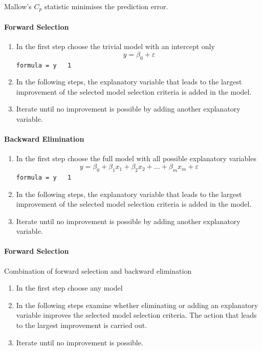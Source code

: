 \documentclass[11pt]{article}
\theoremstyle{definition}
\begin{document}
Mallow’s $C_p$ statistic minimises the prediction error.

\paragraph{Forward Selection}
\begin{enumerate}
	\item In the first step choose the trivial model with an intercept only
	\begin{equation*}
		y=\beta_0 + \varepsilon
	\end{equation*}
	\texttt{formula = y ~ 1}
	\item In the following steps, the explanatory variable that leads to the largest improvement of the selected model selection criteria is added in the model.
	\item Iterate until no improvement is possible by adding another explanatory variable.
\end{enumerate}

\paragraph{Backward Elimination}
\begin{enumerate}
	\item In the first step choose the full model with all possible explanatory variables
	\begin{equation*}
		y=\beta_0 + \beta_1 x_1 + \beta_2 x_2 + \dots + \beta_m x_m + \varepsilon
	\end{equation*}
	\texttt{formula = y ~ 1}
	\item In the following steps, the explanatory variable that leads to the largest improvement of the selected model selection criteria is added in the model.
	\item Iterate until no improvement is possible by adding another explanatory variable.
\end{enumerate}

\paragraph{Forward Selection}
Combination of forward selection and backward elimination
\begin{enumerate}
	\item In the first step choose any model
	\item In the following steps examine whether eliminating or adding an explanatory variable improves the selected model selection criteria. The action that leads to the largest improvement is carried out.
	\item Iterate until no improvement is possible.
\end{enumerate}
\end{document}
